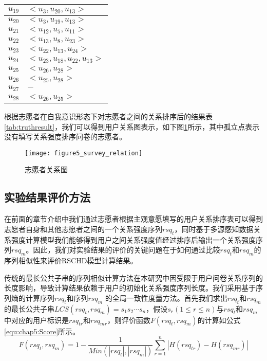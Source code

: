 \begin{table}[htb]
\begin{minipage}[t]{0.8\linewidth}
\begin{tabular*}{\linewidth}{cp{10cm}}
      \hline
      \mbox{$u_{19} $}&\mbox{$ <u_{3},u_{20},u_{13}>$}\\
      \hline
      \mbox{$u_{20}$} & \mbox{$<u_{3},u_{19},u_{13}>$}\\
      \hline
      \mbox{$u_{21}$} & \mbox{$ <u_{12},u_{5},u_{11}>$}\\
      \hline
      \mbox{$u_{22} $}& \mbox{$ <u_{13},u_{8},u_{23}>$}\\
      \hline
      \mbox{$u_{23}$} & \mbox{$ <u_{22},u_{13},u_{24}>$}\\
      \hline
      \mbox{$u_{24}$} &\mbox{$ <u_{23},u_{18},u_{22},u_{13}>$}\\
      \hline
      \mbox{$u_{25} $}&\mbox{$ <u_{26},u_{28}>$}\\
      \hline
      \mbox{$u_{26} $}&\mbox{$ <u_{25},u_{28}>$}\\
      \hline
      \mbox{$u_{27} $}&\mbox{$ -$}\\
      \hline
      \mbox{$u_{28}$} &\mbox{$ <u_{26},u_{25}>$}\\
      \bottomrule[1.5pt]
    \end{tabular*}
  \end{minipage}
\end{table}
\par 根据志愿者在自我意识形态下对志愿者之间的关系排序后的结果表\ref{tab:truthresult}，我们可以得到用户关系图表示，如下图\ref{fig:survey_relation}所示，其中孤立点表示没有填写关系强度排序问卷的志愿者。
\begin{figure}[htb]
\centering
\texttt{[image: figure5\_survey\_relation]}
\caption{志愿者关系图}
\label{fig:survey_relation}
\end{figure}
\subsection{实验结果评价方法}
在前面的章节介绍中我们通过志愿者根据主观意愿填写的用户关系排序表可以得到志愿者自身和其他志愿者之间的一个关系强度序列$rsq_{t}$，同时基于多源感知数据关系强度计算模型我们能够得到用户之间关系强度值经过排序后输出一个关系强度序列$rsq_{m}$。因此，我们对实验结果的评价的关键问题在于如何通过比较$rsq_{t}$和$rsq_{m}$的序列相似性来评价RSCHD模型计算结果。
\par 传统的最长公共子串的序列相似计算方法在本研究中因受限于用户问卷关系序列的长度影响，导致计算结果依赖于用户的初始化关系强度序列长度。我们采用基于序列熵的计算序列$rsq_{t}$和序列$rsq_{m}$ 的全局一致性度量方法。首先我们求出$rsq_{t}$和$rsq_{m}$的最长公共子串$LCS(rsq_{t},rsq_{m})=s_{1}s_{2}\cdots s_{n}$，假设$s_{r}(1\leqslant r \leqslant n)$与$rsq_{t}$和$rsq_{m}$中对应的用户标识是$rsq_{tr}$和$rsq_{mr}$，则评价函数$F(rsq_{t},rsq_{m})$的计算如公式\ref{equ:chap5:Score}所示。
\begin{equation}
\label{equ:chap5:Score}
F(rsq_{t},rsq_{m})=1-\frac{1}{Min(  \left |rsq_{t}  \right |, \left |rsq_{m}  \right | ) }\sum_{r=1}^{n}\left | H(rsq_{tr})-H(rsq_{mr}) \right |
\end{equation}

